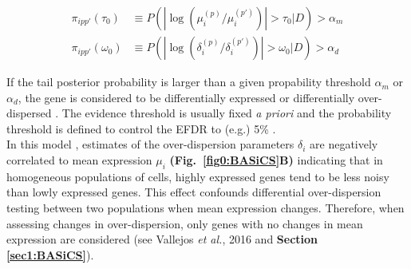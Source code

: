 \begin{align*}
\pi_{ipp'}(\tau_0)&\equiv{}P(|\log(\mu_i^{(p)}/\mu_i^{(p')})|>\tau_0|D)>\alpha_m\\
\pi_{ipp'}(\omega_0)&\equiv{}P(|\log(\delta_i^{(p)}/\delta_i^{(p')})|>\omega_0|D)>\alpha_d
\end{align*}

\newpage

If the tail posterior probability is larger than a given propability threshold $\alpha_m$ or $\alpha_d$, the gene is considered to be differentially expressed or differentially over-dispersed \citep{Vallejos2016}. The evidence threshold is usually fixed \emph{a priori} and the probability threshold is defined to control the \gls{EFDR} to (e.g.) 5\% \cite{Newton2004, Vallejos2016}.\\

In this model \citep{Vallejos2016}, estimates of the over-dispersion parameters $\delta_i$ are negatively correlated to mean expression $\mu_i$ \textbf{(Fig.~\ref{fig0:BASiCS}B)} indicating that in homogeneous populations of cells, highly expressed genes tend to be less noisy than lowly expressed genes. This effect confounds differential over-dispersion testing between two populations when mean expression changes. Therefore, when assessing changes in over-dispersion, only genes with no changes in mean expression are considered (see Vallejos \emph{et al.}, 2016 \citep{Vallejos2016} and \textbf{Section \ref{sec1:BASiCS}}).  

